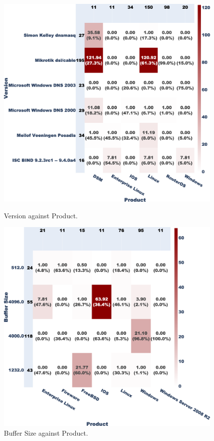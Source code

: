 \begin{figure}[t]
    \centering
    \begin{minipage}[t]{0.45\textwidth}
        \centering
        \includegraphics[width=\textwidth]{research paper/plots/filtered_Version_vs_Product_trim.png}
        \caption{Version against Product.}
        \label{fig:heatmap_version_product}
    \end{minipage}
    \hfill
    \begin{minipage}[t]{0.45\textwidth}
        \centering
        \includegraphics[width=\textwidth]{research paper/plots/filtered_Buffer Size_vs_Product_trim.png}
        \caption{Buffer Size against Product.}
        \label{fig:heatmap_buffer_product}
    \end{minipage}
\end{figure}


